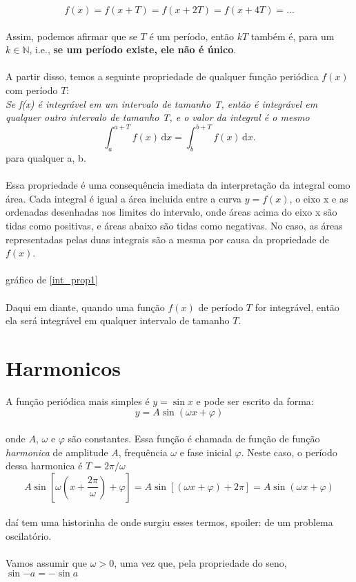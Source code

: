 \documentclass{article}
\newcommand{\senoide}{\mbox{$y = A\sin{(\omega x + \varphi)}$}}
\begin{document}
\begin{equation}
\label{prop2}
    f(x) = f(x + T) = f(x + 2T) = f(x + 4T) = ...
\end{equation} 
\\
Assim, podemos afirmar que se $T$ é um período, então $kT$ também é, para um 
$k \in \mathbb{N}$, i.e., \textbf{se um período existe, ele não é único}.\\
\\ 
A partir disso, temos a seguinte propriedade de qualquer função periódica $f(x)$
com período $T$:\\
\textit{  Se f(x) é integrável em um intervalo de tamanho T,
então é integrável em qualquer outro intervalo de tamanho T, e o valor da integral
é o mesmo}\\
\begin{equation}
\label{int_prop1}
    \int_a^{a+T} \! f(x) \, \mathrm{d}x = \int_b^{b+T} \! f(x) \, \mathrm{d}x.
\end{equation}
para qualquer a, b. \\
\\
Essa propriedade é uma consequência imediata da interpretação da integral como
área. Cada integral é igual a área incluida entre a curva $y=f(x)$, o eixo x e
as ordenadas desenhadas nos limites do intervalo, onde áreas acima do eixo x
são tidas como positivas, e áreas abaixo são tidas como negativas. No caso,
as áreas representadas pelas duas integrais são a mesma por causa da propriedade 
de $f(x)$.\\
\\
{{gráfico de \ref{int_prop1} }}\\
\\
Daqui em diante, quando uma função $f(x)$ de período $T$ for integrável, então
ela será integrável em qualquer intervalo de tamanho $T$.

\section{Harmonicos}
A função periódica mais simples é $y = \sin{x}$ e pode ser escrito da forma:
\begin{equation}
\label{harm}
    \senoide
\end{equation} 
\\
onde $A$, $\omega$ e $\varphi$ são constantes. Essa função é chamada de função 
de função \textit{harmonica} de amplitude $A$, frequência $\omega$ e fase
inicial $\varphi$. Neste caso, o período dessa harmonica é $T = 2\pi / \omega$
\begin{equation}
\label{harm_ex}
    A\sin{[\omega(x+\dfrac{2\pi}{\omega}) + \varphi]} = A\sin{[(\omega x + \varphi) + 2\pi]} = A\sin{(\omega x + \varphi)}
\end{equation}
\\
{{daí tem uma historinha de onde surgiu esses termos, spoiler: de um problema 
oscilatório.}}\\
\\
Vamos assumir que $\omega > 0$, uma vez que, pela propriedade do seno, $\sin{-a} = - \sin{a}$
\end{document}
